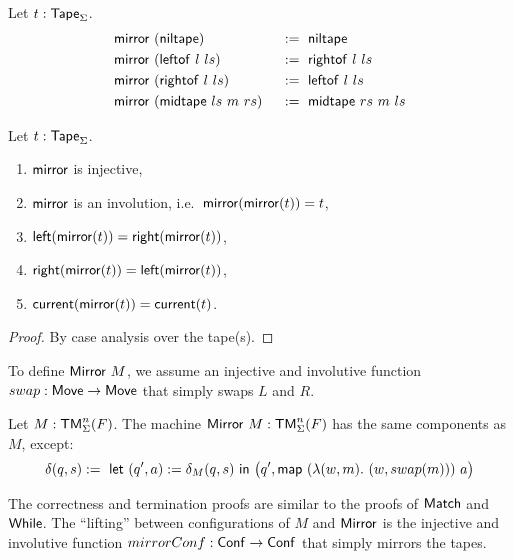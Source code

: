 \begin{definition}
  \label{def:mirror_tape}
  Let $t : \mathsf{Tape}_\Sigma$.
  \begin{alignat*}{2}
    & \mathsf{mirror}~(\mathsf{niltape})         &&~:=~ \mathsf{niltape} \\
    & \mathsf{mirror}~(\mathsf{leftof}~l~ls)     &&~:=~ \mathsf{rightof}~l~ls \\
    & \mathsf{mirror}~(\mathsf{rightof}~l~ls)    &&~:=~ \mathsf{leftof}~l~ls \\
    & \mathsf{mirror}~(\mathsf{midtape}~ls~m~rs) &&~:=~ \mathsf{midtape}~rs~m~ls
  \end{alignat*}
\end{definition}
\begin{lemma}
  \label{lem:mirror}
  Let $t:\mathsf{Tape}_\Sigma$.
  \begin{enumerate}
  \item \label{lem:mirror_tape_injective}
    $\mathsf{mirror}$ is injective,
  \item \label{lem:mirror_tape_involution}
    $\mathsf{mirror}$ is an involution, i.e.\ $\mathsf{mirror}(\mathsf{mirror}(t))=t$,
  \item \label{lem:mirror_left}
    $\mathsf{left}(\mathsf{mirror}(t)) = \mathsf{right}(\mathsf{mirror}(t))$,
  \item \label{lem:mirror_right}
    $\mathsf{right}(\mathsf{mirror}(t)) = \mathsf{left}(\mathsf{mirror}(t))$,
  \item \label{lem:mirror_current}
    $\mathsf{current}(\mathsf{mirror}(t)) = \mathsf{current}(t)$.
  \end{enumerate}
\end{lemma}
\begin{proof}
  By case analysis over the tape(s).
\end{proof}


To define $\MS{Mirror}~M$, we assume an injective and involutive function $swap:\mathsf{Move} \rightarrow \mathsf{Move}$ that simply swaps $L$ and $R$.

\begin{definition}[$\MS{Mirror}~M$]
  \label{def:Mirror}
  Let $M:\mathsf{TM}_\Sigma^n(F)$.  The machine $\mathsf{Mirror}~M : \mathsf{TM}_\Sigma^n(F)$ has the same components as $M$, except:
  \[
    \delta(q, s) :=~
    \mathsf{let}~(q', a) := \delta_M(q,s)~\mathsf{in}~\bigl(q', \mathsf{map}~(\lambda(w, m).~(w, swap(m)))~a \bigr)
  \]
\end{definition}

The correctness and termination proofs are similar to the proofs of $\mathsf{Match}$ and $\mathsf{While}$.  The ``lifting'' between configurations of $M$ and
$\mathsf{Mirror}$ is the injective and involutive function $mirrorConf : \mathsf{Conf} \rightarrow \mathsf{Conf}$ that simply mirrors the tapes.

